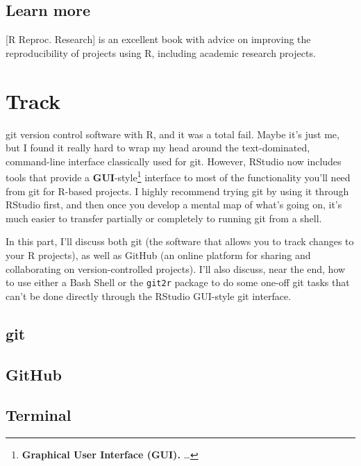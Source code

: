 \documentclass[]{tufte-book}
\begin{document}
\hypertarget{learn-more}{%
\section{Learn more}\label{learn-more}}

{[}R Reproc. Research{]} is an excellent book with advice on improving the reproducibility of
projects using R, including academic research projects.

\hypertarget{track}{%
\chapter{Track}\label{track}}

 git version control software with R, and
it was a total fail. Maybe it's just me, but I found it really hard to wrap my head around
the text-dominated, command-line interface classically used for git. However, RStudio now
includes tools that provide a \textbf{GUI}-style\footnote{\textbf{Graphical User Interface (GUI).} \ldots{}}
interface to most of the functionality you'll need from git for R-based projects. I highly
recommend trying git by using it through RStudio first, and then once you develop a mental
map of what's going on, it's much easier to transfer partially or completely to running git
from a shell.

In this part, I'll discuss both git (the software that allows you to track changes to your
R projects), as well as GitHub (an online platform for sharing and collaborating on
version-controlled projects). I'll also discuss, near the end, how to use either a Bash
Shell or the \texttt{git2r} package to do some one-off git tasks that can't be done directly through
the RStudio GUI-style git interface.

\hypertarget{git}{%
\section{git}\label{git}}

\hypertarget{github}{%
\section{GitHub}\label{github}}

\hypertarget{terminal}{%
\section{Terminal}\label{terminal}}
\end{document}
